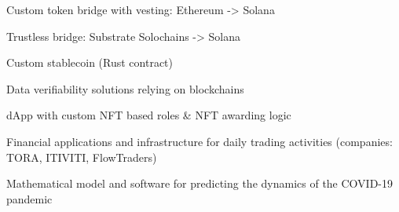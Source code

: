

\vspace{2mm}
  \begin{cvitems} %
    \item {Custom token bridge with vesting: Ethereum -> Solana}
    \item {Trustless bridge: Substrate Solochains -> Solana}
    \item {Custom stablecoin (Rust contract)}
    \item {Data verifiability solutions relying on blockchains}
    \item {dApp with custom NFT based roles \& NFT awarding logic}
    \item {Financial applications and infrastructure for daily trading activities (companies: TORA, ITIVITI, FlowTraders)}
    \item {Mathematical model and software for predicting the dynamics of the COVID-19 pandemic}
  \end{cvitems}
  \vspace{2mm}
